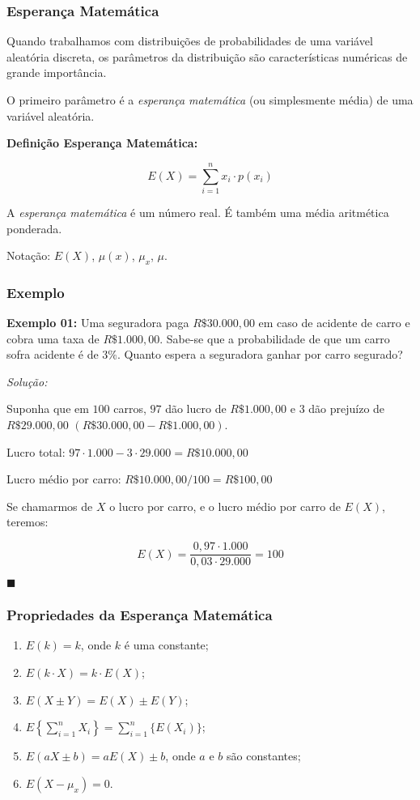 \documentclass[hyperref={pdfpagelabels=false}]{beamer}
\begin{document}
\begin{frame}
\frametitle{Esperança Matemática}

Quando trabalhamos com distribuições de probabilidades de uma variável aleatória discreta, os parâmetros da distribuição são características numéricas de grande importância.

\pause
O primeiro parâmetro é a \emph{esperança matemática} (ou simplesmente média) de uma variável aleatória.

\pause
{\bf Definição Esperança Matemática:}

	$$E(X) = \displaystyle \sum_{i=1}^{n}x_i \cdot p(x_i)$$
	
	A \emph{esperança matemática} é um número real. É também uma média aritmética ponderada. 
	
	Notação: $E(X)$, $\mu(x)$, $\mu_x$, $\mu$.
	
\end{frame}

\begin{frame}
\frametitle{Exemplo}

{\bf Exemplo 01:} Uma seguradora paga $R\$ 30.000,00$ em caso de acidente de carro e cobra uma taxa de $R\$ 1.000,00$. Sabe-se que a probabilidade de que um carro sofra acidente é de $3\%$. Quanto espera a seguradora ganhar por carro segurado?

\pause
{\it Solução:}
\pause

Suponha que em $100$ carros, $97$ dão lucro de $R\$ 1.000,00$ e $3$ dão prejuízo de $R\$ 29.000,00$ $(R\$ 30.000,00 - R\$ 1.000,00)$.
\pause

Lucro total: \pause $97 \cdot 1.000 - 3 \cdot 29.000 = R\$ 10.000,00$

\pause
Lucro médio por carro: \pause $R\$ 10.000,00 / 100 = R\$ 100,00$

\pause
Se chamarmos de $X$ o lucro por carro, e o lucro médio por carro de $E(X)$, teremos:
\pause

$$E(X) = \displaystyle \frac{0,97 \cdot 1.000}{0,03 \cdot 29.000} = 100$$

\begin{flushright}
	$\blacksquare$
\end{flushright}
\end{frame}


\begin{frame}
\frametitle{Propriedades da Esperança Matemática}

\begin{enumerate}
	\item $E(k) = k$, onde $k$ é uma constante; \pause
	\item $E(k\cdot X) = k \cdot E(X)$; \pause
	\item $E(X \pm Y) = E(X) \pm E(Y)$; \pause
	\item $E\left\{ \displaystyle \sum_{i=1}^{n}X_i \right\} = \displaystyle \sum_{i=1}^{n}\{ E(X_i) \}$; \pause
	\item $E(aX \pm b) = aE(X) \pm b$, onde $a$ e $b$ são constantes; \pause
	\item $E(X - \mu_x) = 0$. \pause
\end{enumerate}

\end{frame}
\end{document}
